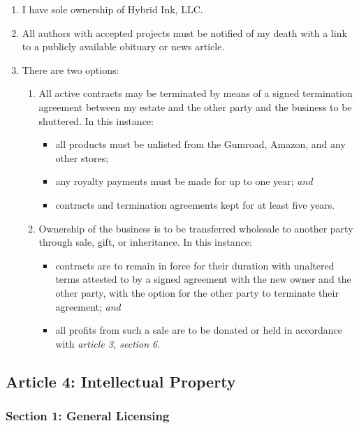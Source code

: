 \documentclass[oneside]{memoir}
\begin{document}
\begin{enumerate}
\def\labelenumi{\arabic{enumi}.}
\tightlist
\item
  I have sole ownership of Hybrid Ink, LLC.
\item
  All authors with accepted projects must be notified of my death with a link to a publicly available obituary or news article.
\item
  There are two options:

  \begin{enumerate}
  \def\labelenumii{\arabic{enumii}.}
  \tightlist
  \item
    All active contracts may be terminated by means of a signed termination agreement between my estate and the other party and the business to be shuttered. In this instance:

    \begin{itemize}
    \tightlist
    \item
      all products must be unlisted from the Gumroad, Amazon, and any other stores;
    \item
      any royalty payments must be made for up to one year; \emph{and}
    \item
      contracts and termination agreements kept for at least five years.
    \end{itemize}
  \item
    Ownership of the business is to be transferred wholesale to another party through sale, gift, or inheritance. In this instance:

    \begin{itemize}
    \tightlist
    \item
      contracts are to remain in force for their duration with unaltered terms attested to by a signed agreement with the new owner and the other party, with the option for the other party to terminate their agreement; \emph{and}
    \item
      all profits from such a sale are to be donated or held in accordance with \emph{article 3, section 6}.
    \end{itemize}
  \end{enumerate}
\end{enumerate}

\subsection*{Article 4: Intellectual Property}\label{article-4-intellectual-property}

\subsubsection*{Section 1: General Licensing}\label{section-1-general-licensing}
\end{document}
